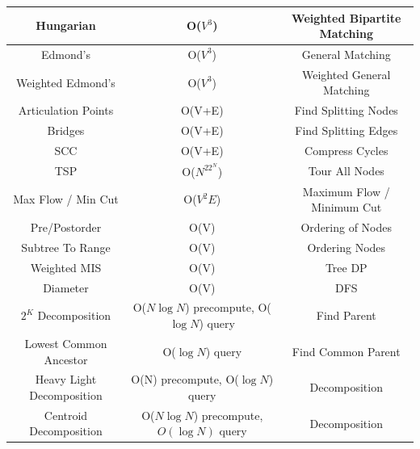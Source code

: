 \documentclass{article}
\begin{document}
\begin{table}[H]
\begin{tabular}{|c|c|c|}
Hungarian                 & O($V^{3}$)                                  & Weighted Bipartite Matching          \\ \hline
Edmond's                  & O($V^{3}$)                                  & General Matching                     \\ \hline
Weighted Edmond's         & O($V^{3}$)                                  & Weighted General Matching            \\ \hline
Articulation Points       & O(V+E)                                      & Find Splitting Nodes                 \\ \hline
Bridges                   & O(V+E)                                      & Find Splitting Edges                 \\ \hline
SCC                       & O(V+E)                                      & Compress Cycles                      \\ \hline
TSP                       & O($N^22^{N}$)                               & Tour All Nodes                       \\ \hline
Max Flow / Min Cut        & O($V^2E$)                                   & Maximum Flow / Minimum Cut           \\ \hline
Pre/Postorder             & O(V)                                        & Ordering of Nodes                    \\ \hline
Subtree To Range          & O(V)                                        & Ordering Nodes                       \\ \hline
Weighted MIS              & O(V)                                        & Tree DP                              \\ \hline
Diameter                  & O(V)                                        & DFS                                  \\ \hline
$2^K$ Decomposition       & O($N\log N$) precompute, O($\log N$) query  & Find Parent                          \\ \hline
Lowest Common Ancestor    & O($\log N$) query                           & Find Common Parent                   \\ \hline
Heavy Light Decomposition & O(N) precompute, O($\log N$) query          & Decomposition                        \\ \hline
Centroid Decomposition    & O($N \log N$) precompute, $O(\log N)$ query & Decomposition                        \\ \hline
\end{tabular}
\end{table}
\end{document}
